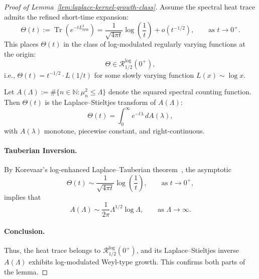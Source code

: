 \begin{proof}[Proof of Lemma~\ref{lem:laplace-kernel-growth-class}]
Assume the spectral heat trace admits the refined short-time expansion:
\[
\Theta(t) := \operatorname{Tr}(e^{-t L_{\mathrm{sym}}^2}) = \frac{1}{\sqrt{4\pi t}} \log\left( \frac{1}{t} \right) + o(t^{-1/2}), \qquad \text{as } t \to 0^+.
\]
This places \( \Theta(t) \) in the class of log-modulated regularly varying functions at the origin:
\[
\Theta \in \mathcal{R}_{1/2}^{\log}(0^+),
\]
i.e., \( \Theta(t) = t^{-1/2} \cdot L(1/t) \) for some slowly varying function \( L(x) \sim \log x \).

Let \( A(\Lambda) := \#\{ n \in \mathbb{N} : \mu_n^2 \le \Lambda \} \) denote the squared spectral counting function. Then \( \Theta(t) \) is the Laplace–Stieltjes transform of \( A(\Lambda) \):
\[
\Theta(t) = \int_0^\infty e^{-t \lambda} \, dA(\lambda),
\]
with \( A(\lambda) \) monotone, piecewise constant, and right-continuous.

\paragraph{Tauberian Inversion.}
By Korevaar’s log-enhanced Laplace–Tauberian theorem~\cite[Ch.~III, Thm.~5.5]{Korevaar2004Tauberian}, the asymptotic
\[
\Theta(t) \sim \frac{1}{\sqrt{4\pi t}} \log\left( \frac{1}{t} \right), \qquad \text{as } t \to 0^+,
\]
implies that
\[
A(\Lambda) \sim \frac{1}{2\pi} \Lambda^{1/2} \log \Lambda, \qquad \text{as } \Lambda \to \infty.
\]

\paragraph{Conclusion.}
Thus, the heat trace belongs to \( \mathcal{R}_{1/2}^{\log}(0^+) \), and its Laplace–Stieltjes inverse \( A(\Lambda) \) exhibits log-modulated Weyl-type growth. This confirms both parts of the lemma.
\end{proof}
